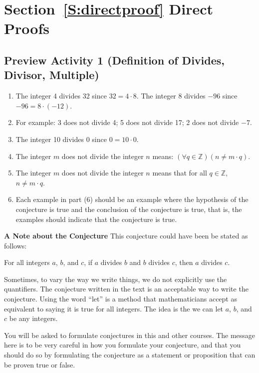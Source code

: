 \section*{Section~\ref{S:directproof} Direct Proofs}

\subsection*{Preview Activity 1 (Definition of Divides, Divisor, Multiple)}

\begin{enumerate} 
  \item The integer 4 divides 32 since $32 = 4 \cdot 8$.  The integer 8 divides $-96$ since 
          $-96 = 8 \cdot (-12)$.
  \item For example:  3 does not divide 4; 5 does not divide 17; 2 does not divide $-7$.
  \item The integer 10 divides 0 since $0 = 10 \cdot 0$.

  \item The integer  $m$  does not divide the integer  $n$  means:  
          $\left( {\forall q \in \mathbb{Z}} \right)\left( {n \ne m \cdot q} \right)$.

\item The integer  $m$  does not divide the integer  $n$  means that for all  
$q \in \mathbb{Z}$, $n \ne m \cdot q$.
\addtocounter{enumi}{1}
\item Each example in part (6) should be an example where the hypothesis of the conjecture is true and the conclusion of the conjecture is true, that is, the examples should indicate that the conjecture is true.
\end{enumerate}

\noindent
\textbf{A Note about the Conjecture}
This conjecture could have been be stated as follows:

\vskip6pt
For all integers $a$, $b$, and  $c$, if $a$ divides $b$ and $b$ divides $c$, then $a$ divides $c$.
\vskip6pt

\noindent
Sometimes, to vary the way we write things, we do not explicitly use the quantifiers.  The conjecture written in the text is an acceptable way to write the conjecture.  Using the word ``let'' is a method that mathematicians accept as equivalent to saying it is true for all integers.  
The idea is the we can let $a$, $b$, and  $c$  be any integers.

You will be asked to formulate conjectures in this and other courses.  The message here is to be very careful in how you formulate your conjecture, and that you should do so by formulating the conjecture as a statement or proposition that can be proven true or false.


